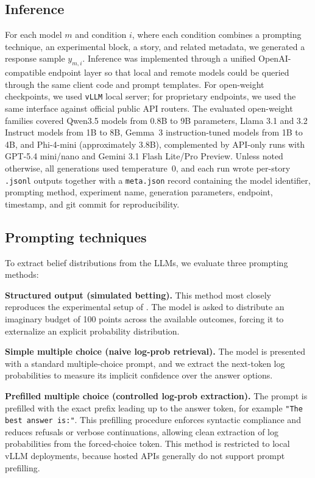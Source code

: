 \documentclass[11pt]{article}
\begin{document}
\subsection{Inference}
For each model $m$ and condition $i$, where each condition combines a prompting technique, 
an experimental block, a story, and related metadata, we generated a response sample $y_{m,i}$. 
Inference was implemented through a unified OpenAI-compatible endpoint layer so that local and 
remote models could be queried through the same client code and prompt templates. For open-weight 
checkpoints, we used \texttt{vLLM} local server; for proprietary endpoints, we used the same 
interface against official public API routers. The evaluated open-weight families covered Qwen3.5 models 
from 0.8B to 9B parameters, Llama 3.1 and 3.2 Instruct models from 1B to 8B, Gemma~3 instruction-tuned 
models from 1B to 4B, and Phi-4-mini (approximately 3.8B), complemented by API-only runs with GPT-5.4 mini/nano and Gemini 3.1 Flash Lite/Pro Preview. 
Unless noted otherwise, all generations used temperature~0, and each run wrote per-story \texttt{.jsonl} 
outputs together with a \texttt{meta.json} record containing the model identifier, prompting method, 
experiment name, generation parameters, endpoint, timestamp, and git commit for reproducibility.

\subsection{Prompting techniques}
To extract belief distributions from the LLMs, we evaluate three prompting methods:

\textbf{Structured output (simulated betting).} This method most closely reproduces the experimental setup 
of \citet{goodmanstuhlmuller2013}. The model is asked to distribute an imaginary budget of 100 points 
across the available outcomes, forcing it to externalize an explicit probability distribution.

 \textbf{Simple multiple choice (naive log-prob retrieval).} The model is presented with a standard 
 multiple-choice prompt, and we extract the next-token log probabilities to measure its implicit confidence
  over the answer options. \citet{kauf_log_2024}

\textbf{Prefilled multiple choice (controlled log-prob extraction).} The prompt is prefilled with the
 exact prefix leading up to the answer token, for example \texttt{"The best answer is:"}. This prefilling 
 procedure enforces syntactic compliance and reduces refusals or verbose continuations, allowing clean 
 extraction of log probabilities from the forced-choice token. \cite{cappelletti_improving_2025} This method is restricted to local vLLM 
 deployments, because hosted APIs generally do not support prompt prefilling.
\end{document}
